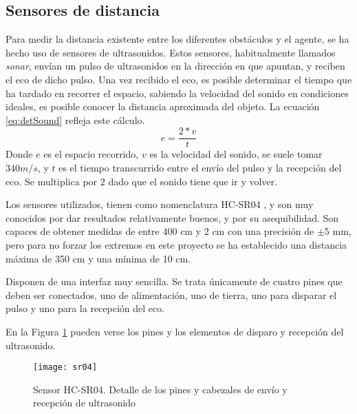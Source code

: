 \subsection{Sensores de distancia}
\label{subsec:hcsr04}
Para medir la distancia existente entre los diferentes obstáculos y el agente, se ha hecho uso de sensores de ultrasonidos. Estos sensores, habitualmente llamados \emph{sonar}, envían un pulso de ultrasonidos en la dirección en que apuntan, y reciben el eco de dicho pulso. Una vez recibido el eco, es posible determinar el tiempo que ha tardado en recorrer el espacio, sabiendo la velocidad del sonido en condiciones ideales, es posible conocer la distancia aproximada del objeto. 
La ecuación \ref{eq:dstSound} refleja este cálculo.
\begin{equation}
\label{eq:dstSound}
e = \frac{2*v}{t}
\end{equation}
Donde $e$ es el espacio recorrido, $v$ es la velocidad del sonido, se suele tomar $340m/s$, y $t$ es el tiempo transcurrido entre el envío del pulso y la recepción del eco. Se multiplica por $2$ dado que el sonido tiene que ir y volver.

Los sensores utilizados, tienen como nomenclatura HC-SR04 \citep{wiki:sparkHCsr04}, y son muy conocidos por dar resultados relativamente buenos, y por su asequibilidad. 
Son capaces de obtener medidas de entre 400 cm y 2 cm con una precisión de $\pm$5 mm, pero para no forzar los extremos en este proyecto se ha establecido una distancia máxima de 350 cm y una mínima de 10 cm. 

Disponen de una interfaz muy sencilla. Se trata únicamente de cuatro pines que deben ser conectados, uno de alimentación, uno de tierra, uno para disparar el pulso y uno para la recepción del eco. 

En la Figura \ref{fig:sr04} pueden verse los pines y los elementos de disparo y recepción del ultrasonido. 

\begin{figure}[H]
	\centering
	\texttt{[image: sr04]}
	\caption[Sensor HC-SR04]{Sensor HC-SR04. Detalle de los pines y cabezales de envío y recepción de ultrasonido}\label{fig:sr04}
\end{figure}

